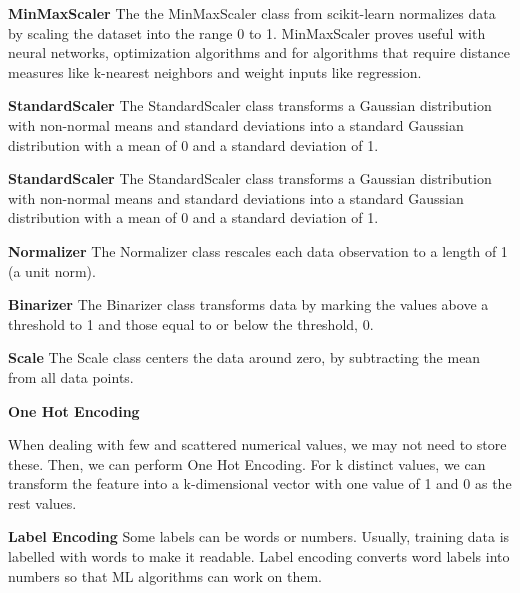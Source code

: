 \begin{description}

\item{ \textbf{MinMaxScaler}}
The the MinMaxScaler class from scikit-learn normalizes data by scaling the dataset into the range 0 to 1. MinMaxScaler proves useful with neural networks, optimization algorithms and for algorithms that require distance measures like k-nearest neighbors and weight inputs like regression.

\item{ \textbf{StandardScaler}}
The StandardScaler class transforms a Gaussian distribution with non-normal means and standard deviations into a standard Gaussian distribution with a mean of 0 and a standard deviation of 1. 

\item{ \textbf{StandardScaler}}
The StandardScaler class transforms a Gaussian distribution with non-normal means and standard deviations into a standard Gaussian distribution with a mean of 0 and a standard deviation of 1. 

\item{ \textbf{Normalizer}}
The Normalizer class rescales each data observation to a length of 1 (a unit norm).

\item{ \textbf{Binarizer}}
The Binarizer class transforms  data by marking the values above a threshold to 1 and those equal to or below the threshold, 0. 

\item{ \textbf{Scale}}
The Scale class  centers the data around zero, by subtracting  the mean from all data points.

\item{ \textbf{One Hot Encoding}}

When dealing with few and scattered numerical values, we may not need to store these. Then, we can perform One Hot Encoding. For k distinct values, we can transform the feature into a k-dimensional vector with one value of 1 and 0 as the rest values.

\item{ \textbf{Label Encoding}}
Some labels can be words or numbers. Usually, training data is labelled with words to make it readable. Label encoding converts word labels into numbers so that ML algorithms can work on them. 

\end{description}

